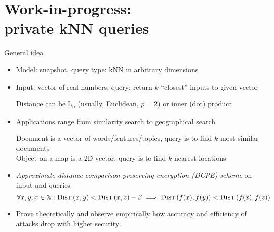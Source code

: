 \section{Work-in-progress: \\ private kNN queries}

	\begin{frame}{General idea}

		\begin{itemize}
			\item<1->
				Model: \alert{snapshot}, query type: \alert{kNN} in arbitrary dimensions

			\item<2->
				Input: vector of real numbers, query: return $k$ ``closest'' inputs to given vector \\
				\begin{small}
					Distance can be $\text{L}_\text{p}$ (usually, Euclidean, $p = 2$) or inner (dot) product
				\end{small}

			\item<3->
				Applications range from similarity search to geographical search \\
				\begin{small}
					Document is a vector of words/features/topics, query is to find $k$ most similar documents \\
					Object on a map is a 2D vector, query is to find $k$ nearest locations
				\end{small}

			\item<4->
				\emph{Approximate distance-comparison preserving encryption (DCPE) scheme} on input and queries
				\[
					\forall x, y, x \in \mathbb{X} : \algo{Dist}{x, y} < \algo{Dist}{x, z} - \beta \implies \algo{Dist}{f(x), f(y)} < \algo{Dist}{f(x), f(z)}
				\]

			\item<5->
				Prove theoretically and observe empirically how accuracy and efficiency of attacks drop with higher security
		\end{itemize}

	\end{frame}

